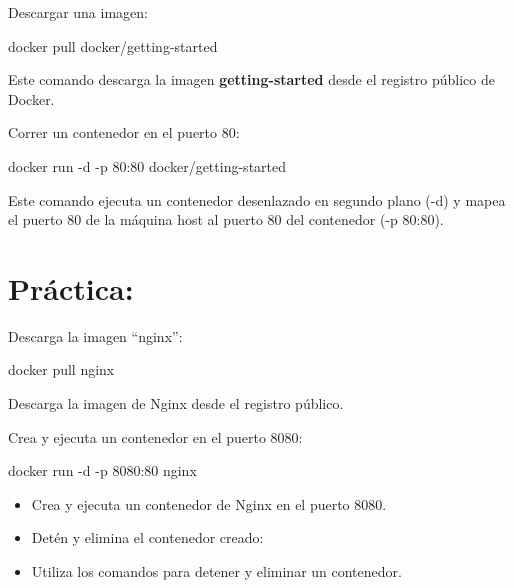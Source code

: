 \documentclass[
  a4paper,
  DIV=11,
  numbers=noendperiod,
  onepage,
  openany]{scrreprt}
\newenvironment{Shaded}{\begin{snugshade}}{\end{snugshade}}
\newcommand{\AttributeTok}[1]{\textcolor[rgb]{0.40,0.45,0.13}{#1}}
\newcommand{\ExtensionTok}[1]{\textcolor[rgb]{0.00,0.23,0.31}{#1}}
\newcommand{\NormalTok}[1]{\textcolor[rgb]{0.00,0.23,0.31}{#1}}
\providecommand{\tightlist}{%
  \setlength{\itemsep}{0pt}\setlength{\parskip}{0pt}}\usepackage{longtable,booktabs,array}
\begin{document}
Descargar una imagen:

\begin{Shaded}
\begin{Highlighting}[]
\ExtensionTok{docker}\NormalTok{ pull docker/getting{-}started}
\end{Highlighting}
\end{Shaded}

Este comando descarga la imagen \textbf{getting-started} desde el
registro público de Docker.

Correr un contenedor en el puerto 80:

\begin{Shaded}
\begin{Highlighting}[]
\ExtensionTok{docker}\NormalTok{ run }\AttributeTok{{-}d} \AttributeTok{{-}p}\NormalTok{ 80:80 docker/getting{-}started}
\end{Highlighting}
\end{Shaded}

Este comando ejecuta un contenedor desenlazado en segundo plano (-d) y
mapea el puerto 80 de la máquina host al puerto 80 del contenedor (-p
80:80).

\hypertarget{pruxe1ctica}{%
\section{Práctica:}\label{pruxe1ctica}}

Descarga la imagen ``nginx'':

\begin{Shaded}
\begin{Highlighting}[]
\ExtensionTok{docker}\NormalTok{ pull nginx}
\end{Highlighting}
\end{Shaded}

Descarga la imagen de Nginx desde el registro público.

Crea y ejecuta un contenedor en el puerto 8080:

\begin{Shaded}
\begin{Highlighting}[]
\ExtensionTok{docker}\NormalTok{ run }\AttributeTok{{-}d} \AttributeTok{{-}p}\NormalTok{ 8080:80 nginx}
\end{Highlighting}
\end{Shaded}

\begin{itemize}
\tightlist
\item
  Crea y ejecuta un contenedor de Nginx en el puerto 8080.
\item
  Detén y elimina el contenedor creado:
\item
  Utiliza los comandos para detener y eliminar un contenedor.
\end{itemize}
\end{document}
